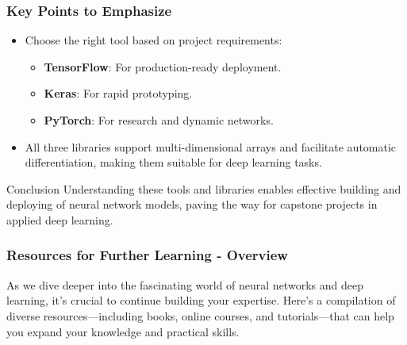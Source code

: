 \documentclass[aspectratio=169]{beamer}
\begin{document}
\begin{frame}[fragile]
    \frametitle{Key Points to Emphasize}
    \begin{itemize}
        \item Choose the right tool based on project requirements:
        \begin{itemize}
            \item \textbf{TensorFlow}: For production-ready deployment.
            \item \textbf{Keras}: For rapid prototyping.
            \item \textbf{PyTorch}: For research and dynamic networks.
        \end{itemize}
        \item All three libraries support multi-dimensional arrays and facilitate automatic differentiation, making them suitable for deep learning tasks.
    \end{itemize}
    
    \begin{block}{Conclusion}
        Understanding these tools and libraries enables effective building and deploying of neural network models, paving the way for capstone projects in applied deep learning.
    \end{block}
\end{frame}

\begin{frame}[fragile]
    \frametitle{Resources for Further Learning - Overview}
    As we dive deeper into the fascinating world of neural networks and deep learning, it's crucial to continue building your expertise. Here’s a compilation of diverse resources—including books, online courses, and tutorials—that can help you expand your knowledge and practical skills.
\end{frame}
\end{document}
